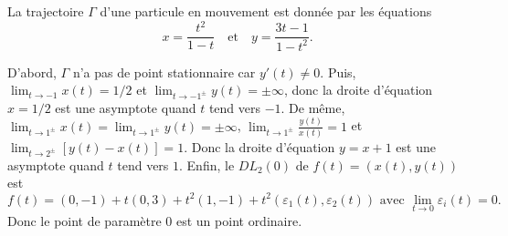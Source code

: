 \begin{question}
La trajectoire $\Gamma$ d'une particule en mouvement est donnée par les équations
$$x=\frac{t^2}{1-t}\quad \mbox{et} \quad y=\frac{3t-1}{1-t^2}.$$
\begin{answers}  
\end{answers}
\begin{explanations}
D'abord, $\Gamma$ n'a pas de point stationnaire car $y'(t)\neq 0$. Puis, $\displaystyle \lim_{t\to -1}x(t)=1/2$ et $\displaystyle \lim_{t\to -1^{\pm}}y(t)=\pm\infty$, donc la droite d'équation $x=1/2$ est une asymptote quand $t$ tend vers $-1$. De même, $\displaystyle \lim_{t\to 1^{\pm}}x(t)=\lim_{t\to 1^{\pm}}y(t)=\pm \infty$, $\displaystyle \lim_{t\to 1^{\pm}}\frac{y(t)}{x(t)}=1$ et $\displaystyle \lim_{t\to 2^{\pm}}[y(t)-x(t)]=1$. Donc la droite d'équation $\displaystyle y=x+1$ est une asymptote quand $t$ tend vers $1$. Enfin, le $DL_2(0)$ de $f(t)=(x(t),y(t))$ est 
$$f(t)=(0,-1)+t(0,3)+t^2(1,-1)+t^2\left(\varepsilon_1(t),\varepsilon_2(t)\right)\mbox{ avec }\lim _{t\to 0}\varepsilon_i(t)=0.$$
Donc le point de paramètre $0$ est un point ordinaire.
\end{explanations}
\end{question}

